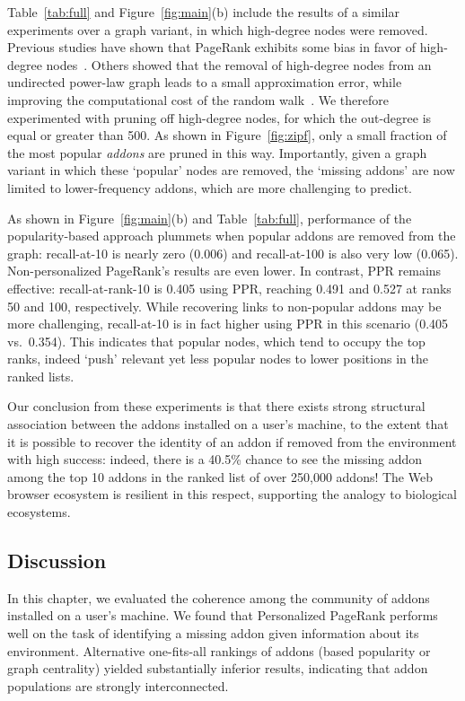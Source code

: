 \documentclass[ijoc,nonblindrev]{informs3} %
\numberwithin{equation}{subsection}
\begin{document}
Table~\ref{tab:full} and Figure~\ref{fig:main}(b) include the results of a similar experiments over a graph variant, in which high-degree nodes were removed. Previous studies have shown that PageRank exhibits some bias in favor of high-degree nodes~\citep{tong2006center,budalakoti2012}. Others showed that the removal of high-degree nodes from an undirected power-law graph leads to a small approximation error, while improving the computational cost of the random walk~\cite{sarkar2010tractable}. We therefore experimented with pruning off high-degree nodes, for which the out-degree is equal or greater than 500. As shown in Figure~\ref{fig:zipf}, only a small fraction of the most popular {\it addons} are pruned in this way. Importantly, given a graph variant in which these `popular' nodes are removed, the `missing addons' are now limited to lower-frequency addons, which are more challenging to predict. 

As shown in Figure~\ref{fig:main}(b) and Table~\ref{tab:full}, performance of the popularity-based approach plummets when popular addons are removed from the graph: recall-at-10 is nearly zero (0.006) and recall-at-100 is also very low (0.065). Non-personalized PageRank's results are even lower. In contrast, PPR remains effective: recall-at-rank-10 is 0.405 using PPR, reaching 0.491 and 0.527 at ranks 50 and 100, respectively. While recovering links to non-popular addons may be more challenging, recall-at-10 is in fact higher using PPR in this scenario (0.405 vs.~0.354). This indicates that popular nodes, which tend to occupy the top ranks, indeed `push' relevant yet less popular nodes to lower positions in the ranked lists.  

Our conclusion from these experiments is that there exists strong structural association between the addons installed on a user's machine, to the extent that it is possible to recover the identity of an addon if removed from the environment with high success: indeed, there is a 40.5\% chance to see the missing addon among the top 10 addons in the ranked list of over 250,000 addons! The Web browser ecosystem is resilient in this respect, supporting the analogy to biological ecosystems.

\subsection{Discussion}

In this chapter, we evaluated the coherence among the community of addons installed on a user's machine. We found that Personalized PageRank performs well on the task of identifying a missing addon given information about its environment. Alternative one-fits-all rankings of addons (based popularity or graph centrality) yielded substantially inferior results, indicating that addon populations are strongly interconnected.  
\end{document}
